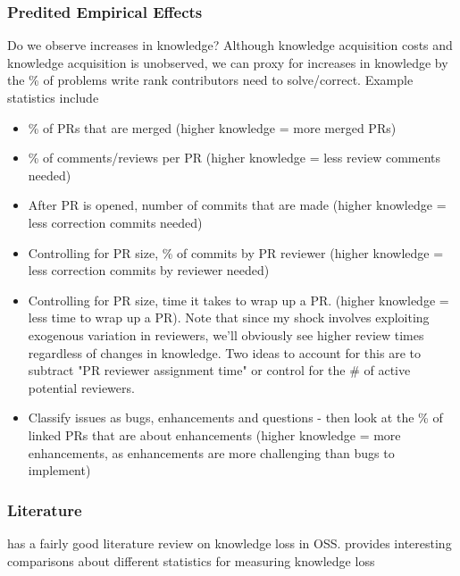 \documentclass[source/paper/main.tex]{subfiles}
\begin{document}
\subsubsection{Predited Empirical Effects}
Do we observe increases in knowledge? Although knowledge acquisition costs and knowledge acquisition is unobserved, we can proxy for increases in knowledge by the \% of problems write rank contributors need to solve/correct. Example statistics include
\begin{itemize}
    \item \% of PRs that are merged (higher knowledge = more merged PRs)
    \item \% of comments/reviews per PR (higher knowledge = less review comments needed)
    \item After PR is opened, number of commits that are made (higher knowledge = less correction commits needed)
    \item Controlling for PR size, \% of commits by PR reviewer (higher knowledge = less correction commits by reviewer needed)
    \item Controlling for PR size, time it takes to wrap up a PR. (higher knowledge = less time to wrap up a PR). Note that since my shock involves exploiting exogenous variation in reviewers, we'll obviously see higher review times regardless of changes in knowledge. Two ideas to account for this are to subtract "PR reviewer assignment time" or control for the \# of active potential reviewers. 
    \item Classify issues as bugs, enhancements and questions - then look at the \% of linked PRs that are about enhancements (higher knowledge = more enhancements, as enhancements are more challenging than bugs to implement)
\end{itemize}

\subsubsection{Literature}
\cite{rashid_exploring_2017} has a fairly good literature review on knowledge loss in OSS. \cite{nassif_revisiting_2017} provides interesting comparisons about different statistics for measuring knowledge loss
\end{document}
